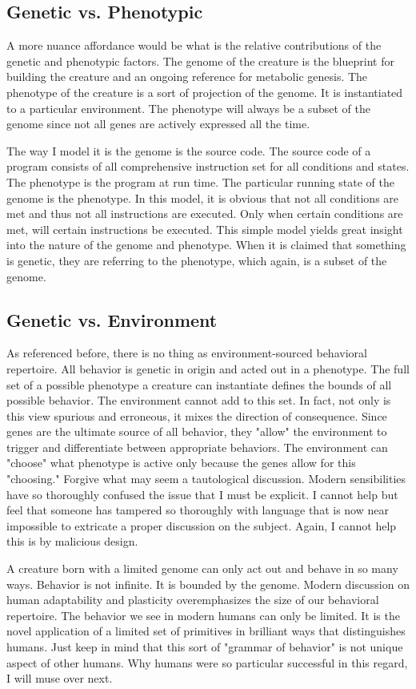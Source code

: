 \documentclass[12pt]{article}
\begin{document}
\subsection{Genetic vs. Phenotypic}
A more nuance affordance would be what is the relative contributions of the genetic and phenotypic factors.
The genome of the creature is the blueprint for building the creature and an ongoing reference for metabolic genesis.
The phenotype of the creature is a sort of projection of the genome.
It is instantiated to a particular environment.
The phenotype will always be a subset of the genome since not all genes are actively expressed all the time.

The way I model it is the genome is the source code.
The source code of a program consists of all comprehensive instruction set for all conditions and states.
The phenotype is the program at run time.
The particular running state of the genome is the phenotype.
In this model, it is obvious that not all conditions are met and thus not all instructions are executed.
Only when certain conditions are met, will certain instructions be executed.
This simple model yields great insight into the nature of the genome and phenotype.
When it is claimed that something is genetic, they are referring to the phenotype, which again, is a subset of the genome.

\subsection{Genetic vs. Environment}
As referenced before, there is no thing as environment-sourced behavioral repertoire.
All behavior is genetic in origin and acted out in a phenotype.
The full set of a possible phenotype a creature can instantiate defines the bounds of all possible behavior.
The environment cannot add to this set.
In fact, not only is this view spurious and erroneous, it mixes the direction of consequence.
Since genes are the ultimate source of all behavior, they "allow" the environment to trigger and differentiate between appropriate behaviors.
The environment can "choose" what phenotype is active only because the genes allow for this "choosing."
Forgive what may seem a tautological discussion.
Modern sensibilities have so thoroughly confused the issue that I must be explicit.
I cannot help but feel that someone has tampered so thoroughly with language that is now near impossible to extricate a proper discussion on the subject.
Again, I cannot help this is by malicious design.

A creature born with a limited genome can only act out and behave in so many ways.
Behavior is not infinite.
It is bounded by the genome.
Modern discussion on human adaptability and plasticity overemphasizes the size of our behavioral repertoire.
The behavior we see in modern humans can only be limited.
It is the novel application of a limited set of primitives in brilliant ways that distinguishes humans.
Just keep in mind that this sort of "grammar of behavior" is not unique aspect of other humans.
Why humans were so particular successful in this regard, I will muse over next.
\end{document}
